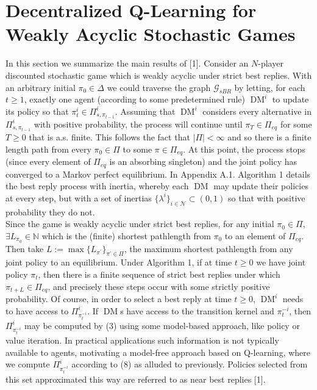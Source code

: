 \documentclass[10pt]{article}
\newcommand{\mbb}[1]{\mathbb{#1}}
\newcommand{\1}[1]{\mathbbm{1}_{#1}}
\newcommand{\mc}[1]{\mathcal{#1}}
\DeclareMathOperator{\DM}{DM}
\begin{document}
\section*{Decentralized Q-Learning for Weakly Acyclic Stochastic Games}
In this section we summarize the main results of [1]. Consider an $N$-player discounted stochastic game which is weakly acyclic under strict best replies. With an arbitrary initial $\pi_0\in\Delta$ we could traverse the graph $\mc{G}_{sBR}$ by letting, for each $t\geq 1$, exactly one agent (according to some predetermined rule) $\DM^i$ to update its policy so that $\pi^i_t\in\Pi^i_{s,\pi_{t-1}}$. Assuming that $\DM^i$ considers every alternative in $\Pi^i_{s,\pi_{t-1}}$ with positive probability, the process will continue until $\pi_T\in\Pi_{eq}$ for some $T\geq 0$ that is a.s. finite.
This follows the fact that $|\Pi|<\infty$ and so there is a finite length path from every $\pi_0\in\Pi$ to some $\pi\in\Pi_{eq}$.
At this point, the process stops (since every element of $\Pi_{eq}$ is an absorbing singleton) and the joint policy has converged to a Markov perfect equilibrium. In Appendix A.1. Algorithm 1 details the best reply process with inertia, whereby each $\DM$ may update their policies at every step, but with a set of inertias $\{\lambda^i\}_{i\in\mc{N}}\subset(0,1)$ so that with positive probability they do not.\\[5pt]
Since the game is weakly acyclic under strict best replies, for any initial $\pi_0\in\Pi$, $\exists L_{\pi_0}\in\mbb{N}$ which is the (finite) shortest pathlength from $\pi_0$ to an element of $\Pi_{eq}$. Then take $L:=\max\{L_{\pi^\prime}\}_{\pi^\prime\in\Pi}$, the maximum shortest pathlength from any joint policy to an equilibrium. Under Algorithm 1, if at time $t\geq 0$ we have joint policy $\pi_t$, then
there is a finite sequence of strict best replies under which $\pi_{t+L}\in\Pi_{eq}$, and precisely these steps occur with some strictly positive probability. Of course, in order to select a best reply at time $t\geq 0$, $\DM^i$ needs to have access to $\Pi^i_{\pi^{-i}_t}$. If $\DM$s have access to the transition kernel
and $\pi_t^{-i}$, then $\Pi^i_{\pi^{-i}_t}$ may be computed by (3) using some model-based approach, like policy or value iteration. In practical applications such information is not typically available to agents, motivating a model-free approach based on Q-learning, where we compute $\Pi^i_{\pi^{-i}_t}$ according to (8) as alluded to previously. Policies selected from this set approximated this way are referred to as near best replies [1].\\[5pt]
\end{document}
